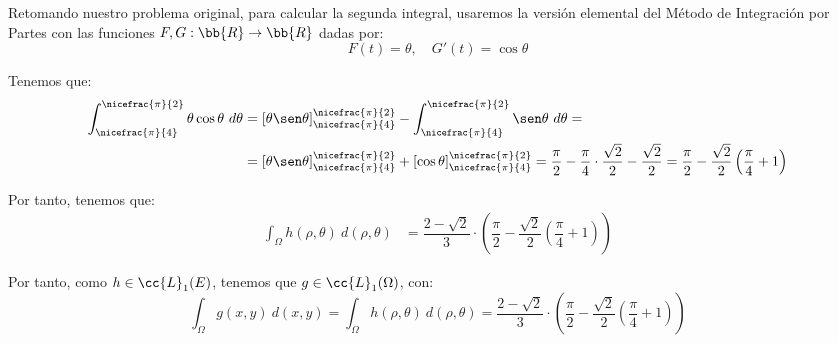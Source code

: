 \begin{ejercicio}
    Retomando nuestro problema original, para calcular la segunda integral, usaremos la versión elemental del Método de Integración por Partes con las funciones $F,G:\bb{R}\to \bb{R}$ dadas por:
    \begin{equation*}
        F(t) = \theta, \quad G'(t) = \cos\theta
    \end{equation*}

    Tenemos que:
    \begin{align*}
        \int_{\nicefrac{\pi}{4}}^{\nicefrac{\pi}{2}} \theta\cos\theta~d\theta &= \left[\theta\sen\theta\right]_{\nicefrac{\pi}{4}}^{\nicefrac{\pi}{2}} - \int_{\nicefrac{\pi}{4}}^{\nicefrac{\pi}{2}} \sen\theta~d\theta =\\
        &= \left[\theta\sen\theta\right]_{\nicefrac{\pi}{4}}^{\nicefrac{\pi}{2}} + \left[\cos\theta\right]_{\nicefrac{\pi}{4}}^{\nicefrac{\pi}{2}} = \dfrac{\pi}{2} - \dfrac{\pi}{4}\cdot \dfrac{\sqrt{2}}{2} -\dfrac{\sqrt{2}}{2}
        = \dfrac{\pi}{2} - \dfrac{\sqrt{2}}{2}\left(\dfrac{\pi}{4}+1\right)
    \end{align*}


    Por tanto, tenemos que:
    \begin{align*}
        \int_{\Omega} h(\rho, \theta)~d(\rho, \theta) &=
        \dfrac{2-\sqrt{2}}{3} \cdot \left(\dfrac{\pi}{2} - \dfrac{\sqrt{2}}{2}\left(\dfrac{\pi}{4}+1\right)\right)
    \end{align*}

    Por tanto, como $h\in \cc{L}_1(E)$, tenemos que $g\in \cc{L}_1(\Omega)$, con:
    \begin{equation*}
        \int_{\Omega} g(x, y)~d(x, y) = \int_{\Omega} h(\rho, \theta)~d(\rho, \theta) = \dfrac{2-\sqrt{2}}{3} \cdot \left(\dfrac{\pi}{2} - \dfrac{\sqrt{2}}{2}\left(\dfrac{\pi}{4}+1\right)\right)
    \end{equation*}
    

\end{ejercicio}


